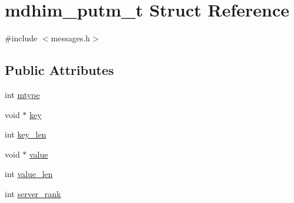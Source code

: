 \hypertarget{structmdhim__putm__t}{\section{mdhim\-\_\-putm\-\_\-t Struct Reference}
\label{d6/dcd/structmdhim__putm__t}
}


{\ttfamily \#include $<$messages.\-h$>$}

\subsection*{Public Attributes}
\begin{DoxyCompactItemize}
\item 
int \hyperlink{structmdhim__putm__t_a632ccc930561029cfbbb28ec2b9929a4}{mtype}
\item 
void $\ast$ \hyperlink{structmdhim__putm__t_a6b5ee783b09f0039b09597e25005396e}{key}
\item 
int \hyperlink{structmdhim__putm__t_afbac7bbcd98d8489c502fbd6599964a0}{key\-\_\-len}
\item 
void $\ast$ \hyperlink{structmdhim__putm__t_adac45376bec0e989940d3a2b4a374daf}{value}
\item 
int \hyperlink{structmdhim__putm__t_af8cba256ae6e9003d55bc640c41f41e1}{value\-\_\-len}
\item 
int \hyperlink{structmdhim__putm__t_ad51fbdc39b6f3f8951b4e87a4f57e3bd}{server\-\_\-rank}
\end{DoxyCompactItemize}



